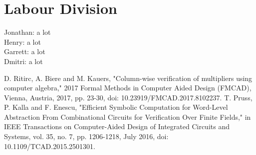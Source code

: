 \documentclass[conference]{IEEEtran}
\begin{document}
\section{Labour Division}
Jonathan: a lot \\
Henry: a lot \\
Garrett: a lot \\
Dmitri: a lot

\begin{thebibliography}{00}
 D. Ritirc, A. Biere and M. Kauers, "Column-wise verification of multipliers using computer algebra," 2017 Formal Methods in Computer Aided Design (FMCAD), Vienna, Austria, 2017, pp. 23-30, doi: 10.23919/FMCAD.2017.8102237.
 T. Pruss, P. Kalla and F. Enescu, "Efficient Symbolic Computation for Word-Level Abstraction From Combinational Circuits for Verification Over Finite Fields," in IEEE Transactions on Computer-Aided Design of Integrated Circuits and Systems, vol. 35, no. 7, pp. 1206-1218, July 2016, doi: 10.1109/TCAD.2015.2501301.
\end{thebibliography}
\vspace{12pt}
\end{document}

